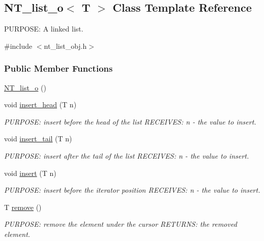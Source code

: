 \subsection{NT\_\-list\_\-o$<$ T $>$ Class Template Reference}
\label{class_n_t__list__o}


PURPOSE: A linked list.  




{\ttfamily \#include $<$nt\_\-list\_\-obj.h$>$}

\subsubsection*{Public Member Functions}
\begin{DoxyCompactItemize}
\item 
\hyperlink{class_n_t__list__o_a8b33b5fad394f9936781ebe33ec79aab}{NT\_\-list\_\-o} ()
\item 
void \hyperlink{class_n_t__list__o_a56a634fb9c307817eb47f00ef82c19b6}{insert\_\-head} (T n)
\begin{DoxyCompactList}\small\item\em PURPOSE: insert before the head of the list RECEIVES: n -\/ the value to insert. \item\end{DoxyCompactList}\item 
void \hyperlink{class_n_t__list__o_a2c64bcef482010d747ddc834bef93abd}{insert\_\-tail} (T n)
\begin{DoxyCompactList}\small\item\em PURPOSE: insert after the tail of the list RECEIVES: n -\/ the value to insert. \item\end{DoxyCompactList}\item 
void \hyperlink{class_n_t__list__o_aa99420af33c5634e350346ba43881dcb}{insert} (T n)
\begin{DoxyCompactList}\small\item\em PURPOSE: insert before the iterator position RECEIVES: n -\/ the value to insert. \item\end{DoxyCompactList}\item 
T \hyperlink{class_n_t__list__o_aa4fe6dfcc1c3168dea9ecd483eb9415c}{remove} ()
\begin{DoxyCompactList}\small\item\em PURPOSE: remove the element under the cursor RETURNS: the removed element. \item\end{DoxyCompactList}\item 

\end{DoxyCompactItemize}
